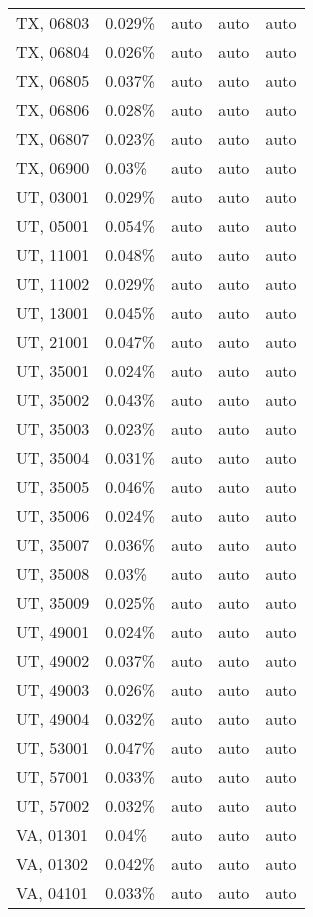 \begin{longtable}[]{@{}lllll@{}}
TX, 06803 & 0.029\% & auto & auto & auto \\
TX, 06804 & 0.026\% & auto & auto & auto \\
TX, 06805 & 0.037\% & auto & auto & auto \\
TX, 06806 & 0.028\% & auto & auto & auto \\
TX, 06807 & 0.023\% & auto & auto & auto \\
TX, 06900 & 0.03\% & auto & auto & auto \\
UT, 03001 & 0.029\% & auto & auto & auto \\
UT, 05001 & 0.054\% & auto & auto & auto \\
UT, 11001 & 0.048\% & auto & auto & auto \\
UT, 11002 & 0.029\% & auto & auto & auto \\
UT, 13001 & 0.045\% & auto & auto & auto \\
UT, 21001 & 0.047\% & auto & auto & auto \\
UT, 35001 & 0.024\% & auto & auto & auto \\
UT, 35002 & 0.043\% & auto & auto & auto \\
UT, 35003 & 0.023\% & auto & auto & auto \\
UT, 35004 & 0.031\% & auto & auto & auto \\
UT, 35005 & 0.046\% & auto & auto & auto \\
UT, 35006 & 0.024\% & auto & auto & auto \\
UT, 35007 & 0.036\% & auto & auto & auto \\
UT, 35008 & 0.03\% & auto & auto & auto \\
UT, 35009 & 0.025\% & auto & auto & auto \\
UT, 49001 & 0.024\% & auto & auto & auto \\
UT, 49002 & 0.037\% & auto & auto & auto \\
UT, 49003 & 0.026\% & auto & auto & auto \\
UT, 49004 & 0.032\% & auto & auto & auto \\
UT, 53001 & 0.047\% & auto & auto & auto \\
UT, 57001 & 0.033\% & auto & auto & auto \\
UT, 57002 & 0.032\% & auto & auto & auto \\
VA, 01301 & 0.04\% & auto & auto & auto \\
VA, 01302 & 0.042\% & auto & auto & auto \\
VA, 04101 & 0.033\% & auto & auto & auto \\

\end{longtable}
